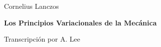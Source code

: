 \documentclass[12pt,oneside]{book}
\numberwithin{equation}{chapter}
\begin{document}
\begin{titlepage}
\centering
{\Large Cornelius Lanczos\par}
\vspace{1cm}
{\huge \textbf{Los Principios Variacionales de la Mecánica}\par}
\vspace{1cm}
{\large Transcripción por A. Lee\par}
\vfill
\end{titlepage}

\tableofcontents
\clearpage











% 
% 

\end{document}
